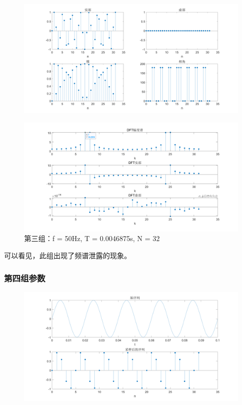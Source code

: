 \documentclass{../source/Experiment copy}
\begin{document}
                \begin{figure}[H]
                    \centering
                    \includegraphics[width = \textwidth]{src/exp2_3_2.png}
                \end{figure}

                \begin{figure}[H]
                    \centering
                    \includegraphics[width = \textwidth]{src/exp2_3_3.png}
                    \caption{第三组：f = 50Hz, T = 0.0046875s, N = 32}
                \end{figure}
            可以看见，此组出现了频谱泄露的现象。
            \subsubsection{第四组参数}
                \begin{figure}[H]
                    \centering
                    \includegraphics[width = \textwidth]{src/exp2_4_1.png}
                \end{figure}
\end{document}
